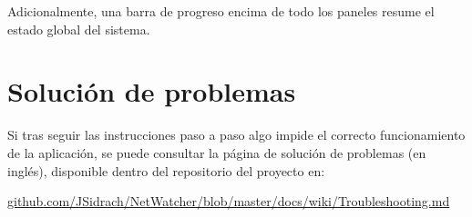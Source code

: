 Adicionalmente, una barra de progreso encima de todo los paneles resume el estado global del sistema.


\section{Solución de problemas\label{extra:manual:solucion}}

Si tras seguir las instrucciones paso a paso algo impide el correcto funcionamiento de la aplicación, se puede consultar la página de solución de problemas (en inglés), disponible dentro del repositorio del proyecto en:

\href{https://github.com/JSidrach/NetWatcher/blob/master/docs/wiki/Troubleshooting.md}{github.com/JSidrach/NetWatcher/blob/master/docs/wiki/Troubleshooting.md}
